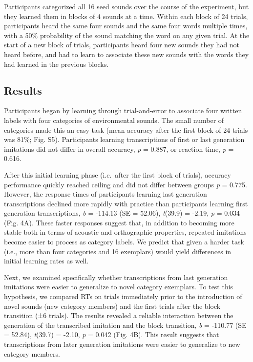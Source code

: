 \documentclass[english,floatsintext,man]{apa6}
\theoremstyle{definition}
\theoremstyle{definition}
\theoremstyle{definition}
\theoremstyle{remark}
\begin{document}
Participants categorized all 16 seed sounds over the course of the
experiment, but they learned them in blocks of 4 sounds at a time.
Within each block of 24 trials, participants heard the same four sounds
and the same four words multiple times, with a 50\% probability of the
sound matching the word on any given trial. At the start of a new block
of trials, participants heard four new sounds they had not heard before,
and had to learn to associate these new sounds with the words they had
learned in the previous blocks.

\hypertarget{results-2}{%
\subsection{Results}\label{results-2}}

Participants began by learning through trial-and-error to associate four
written labels with four categories of environmental sounds. The small
number of categories made this an easy task (mean accuracy after the
first block of 24 trials was 81\%; Fig. S5). Participants learning
transcriptions of first or last generation imitations did not differ in
overall accuracy, \emph{p} = 0.887, or reaction time, \emph{p} = 0.616.

After this initial learning phase (i.e.~after the first block of
trials), accuracy performance quickly reached ceiling and did not differ
between groups \emph{p} = 0.775. However, the response times of
participants learning last generation transcriptions declined more
rapidly with practice than participants learning first generation
transcriptions, \emph{b} = -114.13 (SE = 52.06), \emph{t}(39.9) = -2.19,
\emph{p} = 0.034 (Fig. 4A). These faster responses suggest that, in
addition to becoming more stable both in terms of acoustic and
orthographic properties, repeated imitations become easier to process as
category labels. We predict that given a harder task (i.e., more than
four categories and 16 exemplars) would yield differences in initial
learning rates as well.

Next, we examined specifically whether transcriptions from last
generation imitations were easier to generalize to novel category
exemplars. To test this hypothesis, we compared RTs on trials
immediately prior to the introduction of novel sounds (new category
members) and the first trials after the block transition (±6 trials).
The results revealed a reliable interaction between the generation of
the transcribed imitation and the block transition, \emph{b} = -110.77
(SE = 52.84), \emph{t}(39.7) = -2.10, \emph{p} = 0.042 (Fig. 4B). This
result suggests that transcriptions from later generation imitations
were easier to generalize to new category members.
\end{document}
